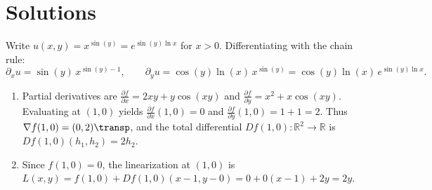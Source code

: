 
\section{Solutions}
\label{sec:differential_solutions}

\begin{exercisesolution}
\label{sol:derivative_computation_exponential}
Write $u(x,y) = x^{\sin(y)} = e^{\sin(y)\ln x}$ for $x > 0$. Differentiating with the chain rule:
\[
\partial_x u = \sin(y)\,x^{\sin(y)-1}, \qquad \partial_y u = \cos(y)\ln(x)\,x^{\sin(y)} = \cos(y)\ln(x)\,e^{\sin(y)\ln x}.
\]
\end{exercisesolution}

\begin{exercisesolution}
\label{sol:ai_differential_linearization}
\begin{enumerate}[label=\textbf{(\alph*)}]
  \item Partial derivatives are $\frac{\partial f}{\partial x} = 2xy + y\cos(xy)$ and $\frac{\partial f}{\partial y} = x^2 + x\cos(xy)$. Evaluating at $(1,0)$ yields $\frac{\partial f}{\partial x}(1,0) = 0$ and $\frac{\partial f}{\partial y}(1,0) = 1 + 1 = 2$. Thus $\nabla f(1,0) = (0, 2)\transp$, and the total differential $Df(1,0) \colon \mathbb{R}^2 \to \mathbb{R}$ is $Df(1,0)(h_1, h_2) = 2h_2$.
  \item Since $f(1,0) = 0$, the linearization at $(1,0)$ is $L(x,y) = f(1,0) + Df(1,0)(x-1, y-0) = 0 + 0(x-1) + 2y = 2y$.
\end{enumerate}
\end{exercisesolution}

